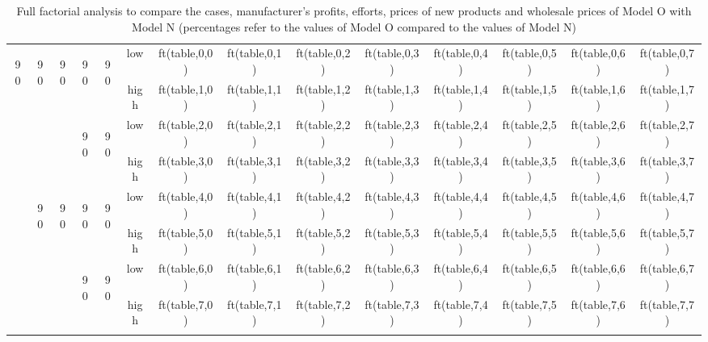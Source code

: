 \documentclass[a4paper,10pt]{article}
\newcommand\tabrotate[1]{\begin{turn}{90}\rlap{{'{#'}}1}\end{turn}}
\begin{document}
\begin{table}[htp]
\begin{center}
\begin{small}
\begin{tabular}{cccccc|cccccccc}
    {%
        {%
           \hline
            \multicolumn{6}{c}{{'{' + table_name + '}' }}\\
            \hline
      \multirow{8}{*}{\tabrotate{s}} &\multirow{4}{*}{\tabrotate{low}} &\multirow{4}{*}{\tabrotate{$c_r$}}&\multirow{2}{*}{\tabrotate{low}}&\multirow{2}{*}{\tabrotate{a}}&low&{{ft(table,0,0)}}&{{ft(table,0,1)}}&{{ft(table,0,2)}}&{{ft(table,0,3)}}&{{ft(table,0,4)}}&{{ft(table,0,5)}}&{{ft(table,0,6)}}&{{ft(table,0,7)}}\\
      & &&&&high&{{ft(table,1,0)}}&{{ft(table,1,1)}}&{{ft(table,1,2)}}&{{ft(table,1,3)}}&{{ft(table,1,4)}}&{{ft(table,1,5)}}&{{ft(table,1,6)}}&{{ft(table,1,7)}}\\
    &&&\multirow{2}{*}{\tabrotate{high}}&\multirow{2}{*}{\tabrotate{a}}&low&{{ft(table,2,0)}}&{{ft(table,2,1)}}&{{ft(table,2,2)}}&{{ft(table,2,3)}}&{{ft(table,2,4)}}&{{ft(table,2,5)}}&{{ft(table,2,6)}}&{{ft(table,2,7)}}\\
    &&&&&high&{{ft(table,3,0)}}&{{ft(table,3,1)}}&{{ft(table,3,2)}}&{{ft(table,3,3)}}&{{ft(table,3,4)}}&{{ft(table,3,5)}}&{{ft(table,3,6)}}&{{ft(table,3,7)}}\\
    &\multirow{4}{*}{\tabrotate{high}}&\multirow{4}{*}{\tabrotate{$c_r$}}&\multirow{2}{*}{\tabrotate{low}}&\multirow{2}{*}{\tabrotate{a}}&low&{{ft(table,4,0)}}&{{ft(table,4,1)}}&{{ft(table,4,2)}}&{{ft(table,4,3)}}&{{ft(table,4,4)}}&{{ft(table,4,5)}}&{{ft(table,4,6)}}&{{ft(table,4,7)}}\\
    &&&&&high&{{ft(table,5,0)}}&{{ft(table,5,1)}}&{{ft(table,5,2)}}&{{ft(table,5,3)}}&{{ft(table,5,4)}}&{{ft(table,5,5)}}&{{ft(table,5,6)}}&{{ft(table,5,7)}}\\
    &&&\multirow{2}{*}{\tabrotate{high}}&\multirow{2}{*}{\tabrotate{a}}&low&{{ft(table,6,0)}}&{{ft(table,6,1)}}&{{ft(table,6,2)}}&{{ft(table,6,3)}}&{{ft(table,6,4)}}&{{ft(table,6,5)}}&{{ft(table,6,6)}}&{{ft(table,6,7)}}\\
    &&&&&high&{{ft(table,7,0)}}&{{ft(table,7,1)}}&{{ft(table,7,2)}}&{{ft(table,7,3)}}&{{ft(table,7,4)}}&{{ft(table,7,5)}}&{{ft(table,7,6)}}&{{ft(table,7,7)}}\\
    {%
    \end{tabular}
      \caption{Full factorial analysis to compare the cases, manufacturer's profits, efforts, prices of new products and wholesale prices of Model O with Model N (percentages refer to the values of Model O compared to the values of Model N)}
      \label{full_factorial}
      \end{small}
    \end{center}
    \end{table}
    
\end{document}
